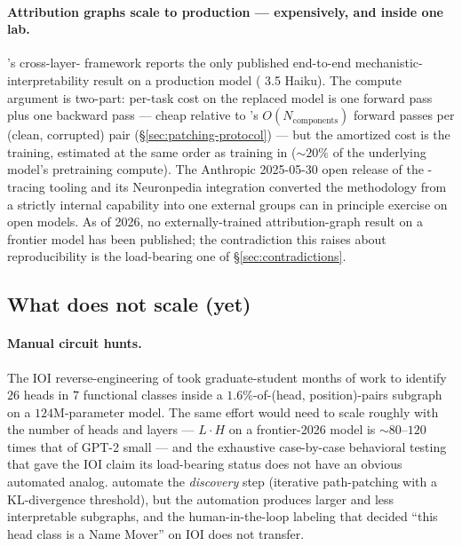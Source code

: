 \paragraph{Attribution graphs scale to production --- expensively, and
inside one lab.}
\citet{lindsey2025-circuit-tracing}'s cross-layer- framework
reports the only published end-to-end mechanistic-interpretability
result on a production model ( 3.5 Haiku). The compute argument
is two-part: per-task cost on the replaced model is one forward pass
plus one backward pass --- cheap relative to 's
$O(N_{\mathrm{components}})$ forward passes per (clean, corrupted) pair
(\S\ref{sec:patching-protocol}) --- but the amortized cost is the
 training, estimated at the same order as 
training in \citet{gemma-scope-2024} ($\sim\! 20\%$ of the underlying
model's pretraining compute). The Anthropic 2025-05-30 open release of
the -tracing tooling and its Neuronpedia integration
 converted the methodology from a strictly internal
capability into one external groups can in principle exercise on open
models. As of 2026, no externally-trained attribution-graph result on a
frontier model has been published; the contradiction this raises about
reproducibility is the load-bearing one of \S\ref{sec:contradictions}.

\subsection{What does not scale (yet)}
\label{sec:scaling-no}

\paragraph{Manual circuit hunts.}
The IOI reverse-engineering of \citet{wang2022-ioi} took graduate-student
months of work to identify $26$ heads in $7$ functional classes inside a
$1.6\%$-of-(head, position)-pairs subgraph on a $124$M-parameter model.
The same effort would need to scale roughly with the number of heads
and layers --- $L \cdot H$ on a frontier-2026 model is $\sim 80$--$120$
times that of GPT-2 small --- and the exhaustive case-by-case behavioral
testing that gave the IOI claim its load-bearing status does not have an
obvious automated analog. \citet{conmy2023-acdc} automate the
\emph{discovery} step (iterative path-patching with a KL-divergence
threshold), but the automation produces larger and less interpretable
subgraphs, and the human-in-the-loop labeling that decided ``this head
class is a Name Mover'' on IOI does not transfer.

